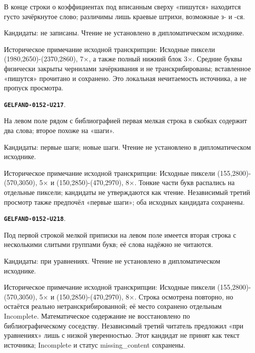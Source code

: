 \documentclass[11pt]{article}
\theoremstyle{definition}
\theoremstyle{remark}
\begin{document}
В конце строки о коэффициентах под вписанным сверху «пишутся» находится густо зачёркнутое слово; различимы лишь краевые штрихи, возможные з- и -ся.\par
Кандидаты: не записаны. Чтение не установлено в дипломатическом исходнике.\par
Историческое примечание исходной транскрипции: Исходные пиксели (1980,2650)-(2370,2860), 7×, а также полный нижний блок 3×. Средние буквы физически закрыты чернилами зачёркивания и не транскрибированы; вставленное «пишутся» прочитано и сохранено. Это локальная нечитаемость источника, а не пропуск просмотра.\par\medskip
\par\noindent\leavevmode{}\label{GELFAND-0152-U217}\label{GELFAND-P001400:margin-first-line:note}\textbf{\texttt{GELFAND-0152-U217}}.\nopagebreak[4]\par
На левом поле рядом с библиографией первая мелкая строка в скобках содержит два слова; второе похоже на «шаги».\par
Кандидаты: первые шаги; новые шаги. Чтение не установлено в дипломатическом исходнике.\par
Историческое примечание исходной транскрипции: Исходные пиксели (155,2800)-(570,3050), 5× и (150,2850)-(470,2970), 8×. Тонкие части букв распались на отдельные пиксели; кандидаты не утверждаются как чтение. Независимый третий просмотр также предпочёл «первые шаги»; оба исходных кандидата сохранены.\par\medskip
\par\noindent\leavevmode{}\label{GELFAND-0152-U218}\label{GELFAND-P001400:margin-second-line:note}\textbf{\texttt{GELFAND-0152-U218}}.\nopagebreak[4]\par
Под первой строкой мелкой приписки на левом поле имеется вторая строка с несколькими слитыми группами букв; её слова надёжно не читаются.\par
Кандидаты: при уравнениях. Чтение не установлено в дипломатическом исходнике.\par
Историческое примечание исходной транскрипции: Исходные пиксели (155,2800)-(570,3050), 5× и (150,2850)-(470,2970), 8×. Строка осмотрена повторно, но остаётся реально нетранскрибированной; её место сохранено отдельным Incomplete. Математическое содержание не восстановлено по библиографическому соседству. Независимый третий читатель предложил «при уравнениях» лишь с низкой уверенностью. Этот кандидат не принят как текст источника; Incomplete и статус missing\_content сохранены.\par\medskip
\end{document}

